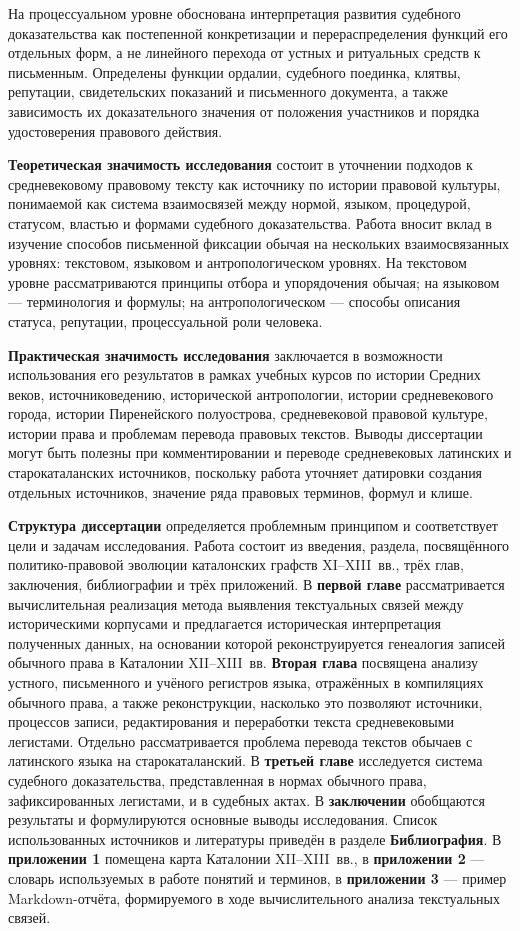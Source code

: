 На процессуальном уровне обоснована интерпретация развития судебного доказательства как постепенной конкретизации и перераспределения функций его отдельных форм, а не линейного перехода от устных и ритуальных средств к письменным. Определены функции ордалии, судебного поединка, клятвы, репутации, свидетельских показаний и письменного документа, а также зависимость их доказательного значения от положения участников и порядка удостоверения правового действия.

\textbf{Теоретическая значимость исследования }состоит в уточнении подходов к средневековому правовому тексту как источнику по истории правовой культуры, понимаемой как система взаимосвязей между нормой, языком, процедурой, статусом, властью и формами судебного доказательства. Работа вносит вклад в изучение способов письменной фиксации обычая на нескольких взаимосвязанных уровнях: текстовом, языковом и антропологическом уровнях. На текстовом уровне рассматриваются принципы отбора и упорядочения обычая; на языковом --- терминология и формулы; на антропологическом --- способы описания статуса, репутации, процессуальной роли человека.

\textbf{Практическая значимость исследования} заключается в возможности использования его результатов в рамках учебных курсов по истории Средних веков, источниковедению, исторической антропологии, истории средневекового города, истории Пиренейского полуострова, средневековой правовой культуре, истории права и проблемам перевода правовых текстов. Выводы диссертации могут быть полезны при комментировании и переводе средневековых латинских и старокаталанских источников, поскольку работа уточняет датировки создания отдельных источников, значение ряда правовых терминов, формул и клише.

\textbf{Структура диссертации }определяется проблемным принципом и соответствует цели и задачам исследования. Работа состоит из введения, раздела, посвящённого политико-правовой эволюции каталонских графств XI--XIII~вв., трёх глав, заключения, библиографии и трёх приложений. В \textbf{первой главе} рассматривается вычислительная реализация метода выявления текстуальных связей между историческими корпусами и предлагается историческая интерпретация полученных данных, на основании которой реконструируется генеалогия записей обычного права в Каталонии XII--XIII~вв. \textbf{Вторая глава} посвящена анализу устного, письменного и учёного регистров языка, отражённых в компиляциях обычного права, а также реконструкции, насколько это позволяют источники, процессов записи, редактирования и переработки текста средневековыми легистами. Отдельно рассматривается проблема перевода текстов обычаев с латинского языка на старокаталанский. В \textbf{третьей главе }исследуется система судебного доказательства, представленная в нормах обычного права, зафиксированных легистами, и в судебных актах. В \textbf{заключении }обобщаются результаты и формулируются основные выводы исследования. Список использованных источников и литературы приведён в разделе \textbf{Библиография}. В \textbf{приложении 1 }помещена карта Каталонии XII--XIII~вв., в \textbf{приложении 2} --- словарь используемых в работе понятий и терминов, в \textbf{приложении 3} --- пример Markdown-отчёта, формируемого в ходе вычислительного анализа текстуальных связей.

